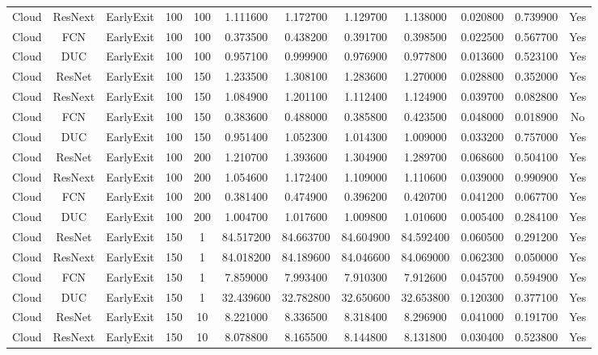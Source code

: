 \begin{tabular}{|c||c||c||c||c||c||c||c||c||c||c||c|}
Cloud & ResNext & EarlyExit & 100 & 100 & 1.111600 & 1.172700 & 1.129700 & 1.138000 & 0.020800 & 0.739900 & Yes \\
Cloud & FCN & EarlyExit & 100 & 100 & 0.373500 & 0.438200 & 0.391700 & 0.398500 & 0.022500 & 0.567700 & Yes \\
Cloud & DUC & EarlyExit & 100 & 100 & 0.957100 & 0.999900 & 0.976900 & 0.977800 & 0.013600 & 0.523100 & Yes \\
Cloud & ResNet & EarlyExit & 100 & 150 & 1.233500 & 1.308100 & 1.283600 & 1.270000 & 0.028800 & 0.352000 & Yes \\
Cloud & ResNext & EarlyExit & 100 & 150 & 1.084900 & 1.201100 & 1.112400 & 1.124900 & 0.039700 & 0.082800 & Yes \\
Cloud & FCN & EarlyExit & 100 & 150 & 0.383600 & 0.488000 & 0.385800 & 0.423500 & 0.048000 & 0.018900 & No \\
Cloud & DUC & EarlyExit & 100 & 150 & 0.951400 & 1.052300 & 1.014300 & 1.009000 & 0.033200 & 0.757000 & Yes \\
Cloud & ResNet & EarlyExit & 100 & 200 & 1.210700 & 1.393600 & 1.304900 & 1.289700 & 0.068600 & 0.504100 & Yes \\
Cloud & ResNext & EarlyExit & 100 & 200 & 1.054600 & 1.172400 & 1.109000 & 1.110600 & 0.039000 & 0.990900 & Yes \\
Cloud & FCN & EarlyExit & 100 & 200 & 0.381400 & 0.474900 & 0.396200 & 0.420700 & 0.041200 & 0.067700 & Yes \\
Cloud & DUC & EarlyExit & 100 & 200 & 1.004700 & 1.017600 & 1.009800 & 1.010600 & 0.005400 & 0.284100 & Yes \\
Cloud & ResNet & EarlyExit & 150 & 1 & 84.517200 & 84.663700 & 84.604900 & 84.592400 & 0.060500 & 0.291200 & Yes \\
Cloud & ResNext & EarlyExit & 150 & 1 & 84.018200 & 84.189600 & 84.046600 & 84.069000 & 0.062300 & 0.050000 & Yes \\
Cloud & FCN & EarlyExit & 150 & 1 & 7.859000 & 7.993400 & 7.910300 & 7.912600 & 0.045700 & 0.594900 & Yes \\
Cloud & DUC & EarlyExit & 150 & 1 & 32.439600 & 32.782800 & 32.650600 & 32.653800 & 0.120300 & 0.377100 & Yes \\
Cloud & ResNet & EarlyExit & 150 & 10 & 8.221000 & 8.336500 & 8.318400 & 8.296900 & 0.041000 & 0.191700 & Yes \\
Cloud & ResNext & EarlyExit & 150 & 10 & 8.078800 & 8.165500 & 8.144800 & 8.131800 & 0.030400 & 0.523800 & Yes \\

\end{tabular}
